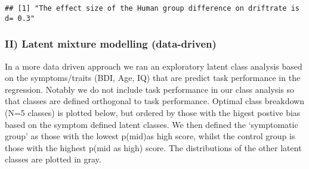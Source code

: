 \documentclass[]{article}
\begin{document}
\begin{verbatim}
## [1] "The effect size of the Human group difference on driftrate is d= 0.3"
\end{verbatim}

\subsubsection{II) Latent mixture modelling
(data-driven)}\label{ii-latent-mixture-modelling-data-driven}

In a more data driven approach we ran an exploratory latent class
analysis based on the symptoms/traits (BDI, Age, IQ) that are predict
task performance in the regression. Notably we do not include task
performance in our class analysis so that classes are defined orthogonal
to task performance. Optimal class breakdown (N=5 classes) is plotted
below, but ordered by those with the higest postive bias based on the
symptom defined latent classes. We then defined the `symptomatic group'
as those with the lowest p(mid)as high score, whilst the control group
is those with the highest p(mid as high) score. The distributions of the
other latent classes are plotted in gray.
\end{document}
